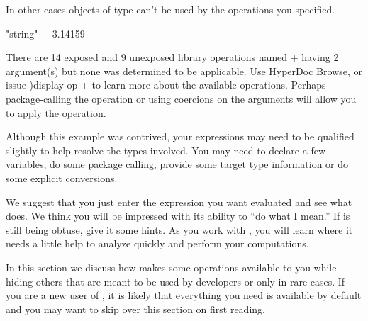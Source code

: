 \begin{xtc}
\begin{xtccomment}
In other cases objects of type  can't be used
by the operations you specified.
\end{xtccomment}
\begin{spadsrc}
"string" + 3.14159
\end{spadsrc}
\begin{MessageOutput}
   There are 14 exposed and 9 unexposed library operations named + 
      having 2 argument(s) but none was determined to be applicable. 
      Use HyperDoc Browse, or issue
                                )display op +
      to learn more about the available operations. Perhaps 
      package-calling the operation or using coercions on the arguments
      will allow you to apply the operation.
\end{MessageOutput}
\end{xtc}
Although this example was contrived, your expressions may need
to be qualified slightly to help \Language{} resolve the
types involved.
You may need to declare a few variables, do some package calling,
provide some target type information or do some explicit
conversions.

We suggest that you just enter the expression you want evaluated and
see what \Language{} does.
We think you will be impressed with its ability to ``do what I
mean.''
If \Language{} is still being obtuse, give it some hints.
As you work with \Language{}, you will learn where it needs a
little help to analyze quickly and perform your computations.


In this section we discuss how \Language{} makes some operations
available to you while hiding others that are meant to be used by
developers or only in rare cases.
If you are a new user of \Language{}, it is likely that everything
you need is available by default and you may want
to skip over this section on first reading.

